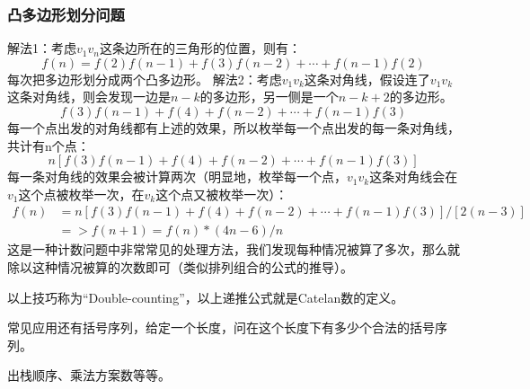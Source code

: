 \documentclass{article}
\begin{document}
\subsubsection{凸多边形划分问题}
解法1：考虑$v_1v_n$这条边所在的三角形的位置，则有：
\begin{equation*}
  f(n)=f(2)f(n-1)+f(3)f(n-2)+\cdots+f(n-1)f(2)
\end{equation*}
每次把多边形划分成两个凸多边形。
解法2：考虑$v_1v_k$这条对角线，假设连了$v_1v_k$这条对角线，则会发现一边是$n-k$的多边形，另一侧是一个$n-k+2$的多边形。
\begin{equation*}
  f(3)f(n-1)+f(4)+f(n-2)+\cdots+f(n-1)f(3)
\end{equation*}
每一个点出发的对角线都有上述的效果，所以枚举每一个点出发的每一条对角线，共计有n个点：
\begin{equation*}
  n[f(3)f(n-1)+f(4)+f(n-2)+\cdots+f(n-1)f(3)]
\end{equation*}
每一条对角线的效果会被计算两次（明显地，枚举每一个点，$v_1v_k$这条对角线会在$v_1$这个点被枚举一次，在$v_k$这个点又被枚举一次）：
\begin{equation*}
  \begin{aligned}
    f(n)&=n[f(3)f(n-1)+f(4)+f(n-2)+\cdots+f(n-1)f(3)]/[2(n-3)]\\
    &=>f(n+1)=f(n)*(4n-6)/n
  \end{aligned}
\end{equation*}
这是一种计数问题中非常常见的处理方法，我们发现每种情况被算了多次，那么就除以这种情况被算的次数即可（类似排列组合的公式的推导）。

以上技巧称为``Double-counting''，以上递推公式就是Catelan数的定义。

常见应用还有括号序列，给定一个长度，问在这个长度下有多少个合法的括号序列。

出栈顺序、乘法方案数等等。
\end{document}

